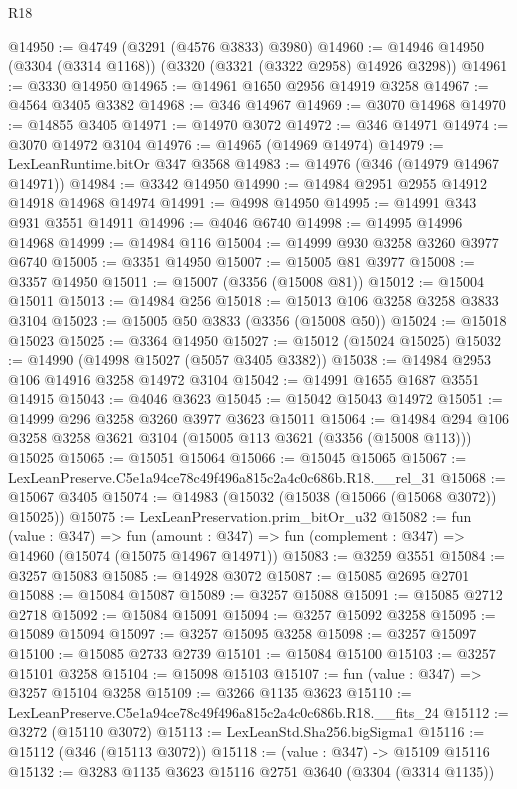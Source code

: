 \begin{lexlean}{R18}
\begin{coremodule}
@14950 := @4749 (@3291 (@4576 @3833) @3980)
@14960 := @14946 @14950 (@3304 (@3314 @1168)) (@3320 (@3321 (@3322 @2958) @14926 @3298))
@14961 := @3330 @14950
@14965 := @14961 @1650 @2956 @14919 @3258
@14967 := @4564 @3405 @3382
@14968 := @346 @14967
@14969 := @3070 @14968
@14970 := @14855 @3405
@14971 := @14970 @3072
@14972 := @346 @14971
@14974 := @3070 @14972 @3104
@14976 := @14965 (@14969 @14974)
@14979 := LexLeanRuntime.bitOr @347 @3568
@14983 := @14976 (@346 (@14979 @14967 @14971))
@14984 := @3342 @14950
@14990 := @14984 @2951 @2955 @14912 @14918 @14968 @14974
@14991 := @4998 @14950
@14995 := @14991 @343 @931 @3551 @14911
@14996 := @4046 @6740
@14998 := @14995 @14996 @14968
@14999 := @14984 @116
@15004 := @14999 @930 @3258 @3260 @3977 @6740
@15005 := @3351 @14950
@15007 := @15005 @81 @3977
@15008 := @3357 @14950
@15011 := @15007 (@3356 (@15008 @81))
@15012 := @15004 @15011
@15013 := @14984 @256
@15018 := @15013 @106 @3258 @3258 @3833 @3104
@15023 := @15005 @50 @3833 (@3356 (@15008 @50))
@15024 := @15018 @15023
@15025 := @3364 @14950
@15027 := @15012 (@15024 @15025)
@15032 := @14990 (@14998 @15027 (@5057 @3405 @3382))
@15038 := @14984 @2953 @106 @14916 @3258 @14972 @3104
@15042 := @14991 @1655 @1687 @3551 @14915
@15043 := @4046 @3623
@15045 := @15042 @15043 @14972
@15051 := @14999 @296 @3258 @3260 @3977 @3623 @15011
@15064 := @14984 @294 @106 @3258 @3258 @3621 @3104 (@15005 @113 @3621 (@3356 (@15008 @113))) @15025
@15065 := @15051 @15064
@15066 := @15045 @15065
@15067 := LexLeanPreserve.C5e1a94ce78c49f496a815c2a4c0c686b.R18.__rel_31
@15068 := @15067 @3405
@15074 := @14983 (@15032 (@15038 (@15066 (@15068 @3072)) @15025))
@15075 := LexLeanPreservation.prim_bitOr_u32
@15082 := fun (value : @347) =>
  fun (amount : @347) => fun (complement : @347) => @14960 (@15074 (@15075 @14967 @14971))
@15083 := @3259 @3551
@15084 := @3257 @15083
@15085 := @14928 @3072
@15087 := @15085 @2695 @2701
@15088 := @15084 @15087
@15089 := @3257 @15088
@15091 := @15085 @2712 @2718
@15092 := @15084 @15091
@15094 := @3257 @15092 @3258
@15095 := @15089 @15094
@15097 := @3257 @15095 @3258
@15098 := @3257 @15097
@15100 := @15085 @2733 @2739
@15101 := @15084 @15100
@15103 := @3257 @15101 @3258
@15104 := @15098 @15103
@15107 := fun (value : @347) => @3257 @15104 @3258
@15109 := @3266 @1135 @3623
@15110 := LexLeanPreserve.C5e1a94ce78c49f496a815c2a4c0c686b.R18.__fits_24
@15112 := @3272 (@15110 @3072)
@15113 := LexLeanStd.Sha256.bigSigma1
@15116 := @15112 (@346 (@15113 @3072))
@15118 := (value : @347) -> @15109 @15116
@15132 := @3283
    @1135
    @3623
    @15116
    @2751
    @3640
    (@3304 (@3314 @1135))

\end{coremodule}
\end{lexlean}

